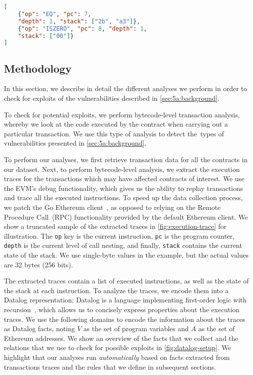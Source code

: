 \begin{lstlisting}[basicstyle=\footnotesize\ttfamily,language=json,float=tb,floatplacement=tb,caption=Sample execution trace information.,label=fig:execution-trace]
[
    {"op": "EQ", "pc": 7, 
    "depth": 1, "stack": ["2b", "a3"]},
    {"op": "ISZERO", "pc": 8, "depth": 1,
    "stack": ["00"]}
]
\end{lstlisting}

\subsection{Methodology}
\label{sec:5a:methodology}

In this section, we describe in detail the different analyses we perform in order to check for exploits of the vulnerabilities described in \autoref{sec:5a:background}.

To check for potential exploits, we perform bytecode-level transaction analysis, whereby we look at the code executed by the contract when carrying out a particular transaction. We use this type of analysis to detect the~\VulnTypes types of vulnerabilities presented in \autoref{sec:5a:background}.

To perform our analyses, we first retrieve transaction data for all the contracts in our dataset. Next, to perform bytecode-level analysis, we extract the execution traces for the transactions which may have affected contracts of interest. We use the EVM's debug functionality, which gives us the ability to replay transactions and trace all the executed instructions. To speed up the data collection process, we patch the Go Ethereum client~\cite{go-ethereum}, as opposed to relying on the Remote Procedure Call~(RPC) functionality provided by the default Ethereum client.
We show a truncated sample of the extracted traces in \autoref{fig:execution-trace} for illustration.
%
The \lstinline{op} key is the current instruction, \lstinline{pc} is the program counter, \lstinline{depth} is the current level of call nesting, and finally, \lstinline{stack} contains the current state of the stack. We use single-byte values in the example, but the actual values are 32 bytes (256 bits).

The extracted traces contain a list of executed instructions, as well as the state of the stack at each instruction.
To analyze the traces, we encode them into a Datalog representation; Datalog is a language implementing first-order logic with recursion~\cite{Immerman99descriptivecomplexity}, which allows us to concisely express properties about the execution traces.
We use the following domains to encode the information about the traces as Datalog facts, noting $V$ as the set of program variables and $A$ as the set of Ethereum addresses.
We show an overview of the facts that we collect and the relations that we use to check for possible exploits in \autoref{fig:datalog-setup}.
We highlight that our analyses run \emph{automatically} based on facts extracted from transactions traces and the rules that we define in subsequent sections.

